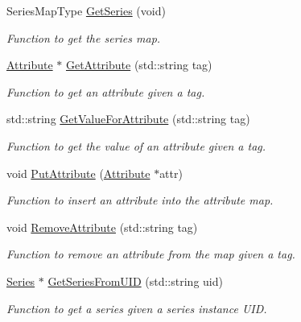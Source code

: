 \begin{DoxyCompactItemize}
SeriesMapType \hyperlink{class_study_a872e67ac16b5f020645548ce3f7e284d}{GetSeries} (void)
\begin{DoxyCompactList}\small\item\em Function to get the series map. \item\end{DoxyCompactList}\item 
\hyperlink{class_attribute}{Attribute} $\ast$ \hyperlink{class_study_abe27af4586178f00f6f659e39c792553}{GetAttribute} (std::string tag)
\begin{DoxyCompactList}\small\item\em Function to get an attribute given a tag. \item\end{DoxyCompactList}\item 
std::string \hyperlink{class_study_af43635fba7ca4163a9b9b52fde75658f}{GetValueForAttribute} (std::string tag)
\begin{DoxyCompactList}\small\item\em Function to get the value of an attribute given a tag. \item\end{DoxyCompactList}\item 
void \hyperlink{class_study_a68c5bd043810e4eebd6e2c208234e431}{PutAttribute} (\hyperlink{class_attribute}{Attribute} $\ast$attr)
\begin{DoxyCompactList}\small\item\em Function to insert an attribute into the attribute map. \item\end{DoxyCompactList}\item 
void \hyperlink{class_study_a873719dccb168fc765fc0266e040db98}{RemoveAttribute} (std::string tag)
\begin{DoxyCompactList}\small\item\em Function to remove an attribute from the map given a tag. \item\end{DoxyCompactList}\item 
\hyperlink{class_series}{Series} $\ast$ \hyperlink{class_study_af72357f07be61edd6de476fa1c3de7a8}{GetSeriesFromUID} (std::string uid)
\begin{DoxyCompactList}\small\item\em Function to get a series given a series instance UID. \item\end{DoxyCompactList}\item 

\end{DoxyCompactItemize}
